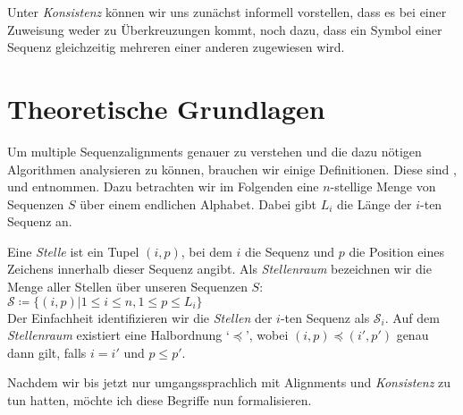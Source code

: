 Unter \emph{Konsistenz} können wir uns zunächst informell vorstellen, dass es bei einer Zuweisung weder zu Überkreuzungen kommt, noch dazu, dass ein Symbol einer Sequenz gleichzeitig mehreren einer anderen zugewiesen wird.

\section{Theoretische Grundlagen}

Um multiple Sequenzalignments genauer zu verstehen und die dazu nötigen Algorithmen analysieren zu können, brauchen wir einige Definitionen. Diese sind \citet{mdw96}, \citet{am00} und \citet{cpm10} entnommen. Dazu betrachten wir im Folgenden eine $n$-stellige Menge von Sequenzen $S$ über einem endlichen Alphabet. Dabei gibt $L_i$ die Länge der $i$-ten Sequenz an.

\begin{definition}
	Eine \emph{Stelle} ist ein Tupel $(i,p)$, bei dem $i$ die Sequenz und $p$ die Position eines Zeichens innerhalb dieser Sequenz angibt. Als \emph{Stellenraum} bezeichnen wir die Menge aller Stellen über unseren Sequenzen $S$: $\mathcal{S} \coloneqq \{(i,p)|1 \leq i \leq n, 1 \leq p \leq L_i \}$ \\
	Der Einfachheit identifizieren wir die \emph{Stellen} der $i$-ten Sequenz als $\mathcal{S}_i$. Auf dem \emph{Stellenraum} existiert eine Halbordnung `$\preceq$', wobei $(i,p) \preceq (i',p')$ genau dann gilt, falls $i=i'$ und $p\leq p'$.
\end{definition}

Nachdem wir bis jetzt nur umgangssprachlich mit Alignments und \emph{Konsistenz} zu tun hatten, möchte ich diese Begriffe nun formalisieren.


